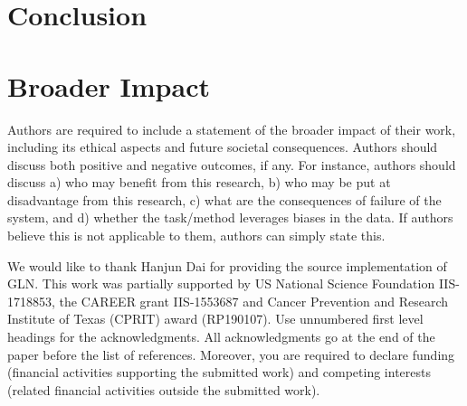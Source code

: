 \section{Conclusion}

\section*{Broader Impact}

Authors are required to include a statement of the broader impact of their work, including its ethical aspects and future societal consequences. 
Authors should discuss both positive and negative outcomes, if any. For instance, authors should discuss a) 
who may benefit from this research, b) who may be put at disadvantage from this research, c) what are the consequences of failure of the system, and d) whether the task/method leverages
biases in the data. If authors believe this is not applicable to them, authors can simply state this.


\begin{ack}
We would like to thank Hanjun Dai for providing the source implementation of GLN. This work was
partially supported by US National Science Foundation IIS-1718853, the CAREER grant IIS-1553687
and Cancer Prevention and Research Institute of Texas (CPRIT) award (RP190107).
Use unnumbered first level headings for the acknowledgments. All acknowledgments
go at the end of the paper before the list of references. Moreover, you are required to declare 
funding (financial activities supporting the submitted work) and competing interests (related financial activities outside the submitted work). 
\end{ack}
